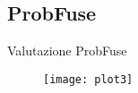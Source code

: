 \subsection{ProbFuse}
\begin{frame}{Valutazione ProbFuse}
	\begin{figure}
	\texttt{[image: plot3]}
	\end{figure}
	
\end{frame}